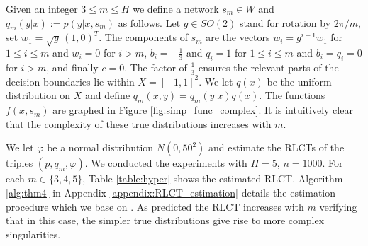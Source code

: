 \documentclass[11pt]{article}
\numberwithin{equation}{section}
\theoremstyle{plain}
\theoremstyle{definition}
\begin{document}
%


Given an integer $3 \le m \le H$ we define a network $s_m \in W$ and $q_m(y|x) := p(y|x, s_m)$ as follows. Let $g \in SO(2)$ stand for rotation by $2\pi/m$, set $w_1 = \sqrt{g} \, (1,0)^T$. The components of $s_m$ are the vectors $w_i = g^{i-1} w_1$ for $1 \le i \le m$ and $w_i = 0$ for $i > m$, $b_i = - \tfrac{1}{3}$ and $q_i = 1$ for $1 \le i \le m$ and $b_i = q_i = 0$ for $i > m$, and finally $c = 0$. The factor of $\tfrac{1}{3}$ ensures the relevant parts of the decision boundaries lie within $X = [-1,1]^2$. We let $q(x)$ be the uniform distribution on $X$ and define $q_m(x,y) = q_m(y|x) q(x)$. The functions $f(x,s_m)$ are graphed in Figure \ref{fig:simp_func_complex}. It is intuitively clear that the complexity of these true distributions increases with $m$.

We let $\varphi$ be a normal distribution $N(0,50^2)$ and estimate the RLCTs of the triples $(p, q_m, \varphi)$. We conducted the experiments with $H = 5$, $n = 1000$. For each $m \in \{3,4,5\}$, Table \ref{table:hyper} shows the estimated RLCT. Algorithm \ref{alg:thm4} in Appendix \ref{appendix:RLCT_estimation} details the estimation procedure which we base on \citep[Theorem 4]{watanabe_widely_2013}. As predicted the RLCT increases with $m$ verifying that in this case, the simpler true distributions give rise to more complex singularities.
\end{document}
